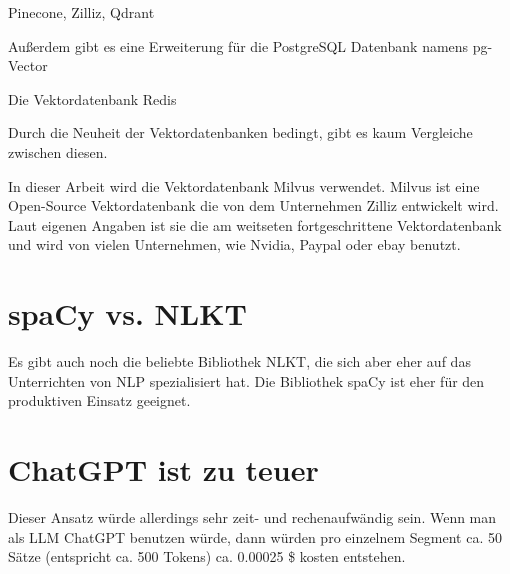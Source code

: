 Pinecone, Zilliz, Qdrant

Außerdem gibt es eine Erweiterung für die PostgreSQL Datenbank namens pg-Vector

Die Vektordatenbank Redis

Durch die Neuheit der Vektordatenbanken bedingt, gibt es kaum Vergleiche zwischen diesen.
\cite{blueteamai}


In dieser Arbeit wird die Vektordatenbank Milvus verwendet.
Milvus ist eine Open-Source Vektordatenbank die von dem Unternehmen Zilliz entwickelt wird.
Laut eigenen Angaben ist sie die am weitseten fortgeschrittene Vektordatenbank und wird von vielen Unternehmen, wie Nvidia, Paypal oder ebay benutzt.

\section{spaCy vs. NLKT}

Es gibt auch noch die beliebte Bibliothek NLKT, die sich aber eher auf das Unterrichten von NLP spezialisiert hat.
Die Bibliothek spaCy ist eher für den produktiven Einsatz geeignet.

\section{ChatGPT ist zu teuer}

Dieser Ansatz würde allerdings sehr zeit- und rechenaufwändig sein.
Wenn man als LLM ChatGPT benutzen würde, dann würden pro einzelnem Segment ca. 50 Sätze (entspricht ca. 500 Tokens) ca. 0.00025 \$ kosten entstehen.
